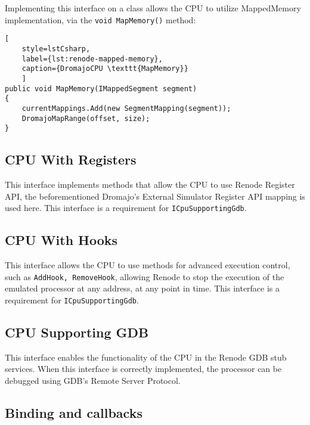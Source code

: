 \noindent
Implementing this interface on a class allows the CPU to utilize MappedMemory implementation, via the \texttt{void MapMemory()} method:

\begin{lstlisting}[
    style=lstCsharp,
    label={lst:renode-mapped-memory},
    caption={DromajoCPU \texttt{MapMemory}}
    ]
public void MapMemory(IMappedSegment segment)
{
    currentMappings.Add(new SegmentMapping(segment));
    DromajoMapRange(offset, size);
}
\end{lstlisting}

\subsection*{CPU With Registers}
This interface implements methods that allow the CPU to use Renode Register API, the beforementioned Dromajo's External
Simulator Register API mapping is used here. This interface is a requirement for \texttt{ICpuSupportingGdb}.

\subsection*{CPU With Hooks}
This interface allows the CPU to use methods for advanced execution control, such as \texttt{AddHook, RemoveHook},
allowing Renode to stop the execution of the emulated processor at any address, at any point in time.
This interface is a requirement for \texttt{ICpuSupportingGdb}.

\pagebreak

\subsection*{CPU Supporting GDB}

This interface enables the functionality of the CPU in the Renode GDB stub services. When this interface is correctly
implemented, the processor can be debugged using GDB's Remote Server Protocol.

\subsection{Binding and callbacks}

